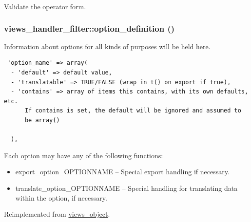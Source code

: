 Validate the operator form. \hypertarget{classviews__handler__filter_053c9173084f1409a92eb390854ec304}{
\subsubsection[{option\_\-definition}]{\setlength{\rightskip}{0pt plus 5cm}views\_\-handler\_\-filter::option\_\-definition ()}}
\label{classviews__handler__filter_053c9173084f1409a92eb390854ec304}


Information about options for all kinds of purposes will be held here. 

\begin{Code}\begin{verbatim} 'option_name' => array(
  - 'default' => default value,
  - 'translatable' => TRUE/FALSE (wrap in t() on export if true),
  - 'contains' => array of items this contains, with its own defaults, etc.
      If contains is set, the default will be ignored and assumed to
      be array()

  ),
\end{verbatim}
\end{Code}

 Each option may have any of the following functions:\begin{itemize}
\item export\_\-option\_\-OPTIONNAME -- Special export handling if necessary.\item translate\_\-option\_\-OPTIONNAME -- Special handling for translating data within the option, if necessary. \end{itemize}


Reimplemented from \hyperlink{classviews__object_b0753d0001c8c9ff98beee696b4516ba}{views\_\-object}.

